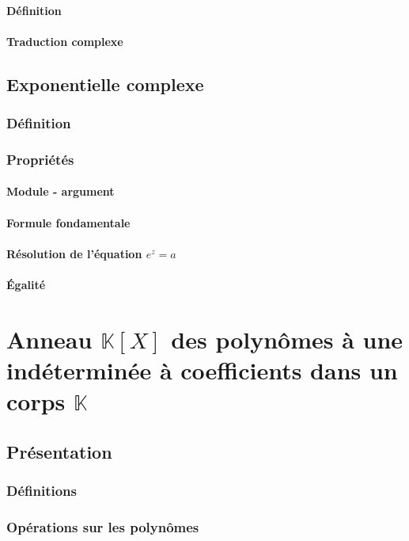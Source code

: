 \documentclass[12pt,a4paper,french]{book}
\begin{document}
			\subsubsection{Définition}
			\subsubsection{Traduction complexe}
	\section{Exponentielle complexe}
		\subsection{Définition}
		\subsection{Propriétés}
			\subsubsection{Module - argument}
			\subsubsection{Formule fondamentale}
			\subsubsection{Résolution de l'équation $e^{z} = a$}
			\subsubsection{Égalité}
			
		
\chapter{Anneau $\mathbb{K}[X]$ des polynômes à une indéterminée à coefficients dans un corps $\mathbb{K}$}
	\section{Présentation}
		\subsection{Définitions}
		\subsection{Opérations sur les polynômes}
\end{document}
